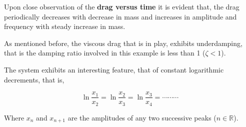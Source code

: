 {Upon close observation of the \textbf{drag versus time} it is evident that, the drag periodically decreases with decrease in mass and increases in amplitude and frequency with steady increase in mass.}

{As mentioned before, the viscous drag that is in play, exhibits underdamping, that is the damping ratio involved in this example is less than 1 ($\zeta < 1$).}

{The system exhibits an interesting feature, that of constant logarithmic decrements, that is,}
        
    $$\ln{\frac{x_1}{x_2}} = \ln{\frac{x_2}{x_3}} = \ln{\frac{x_3}{x_4}} = \cdots\cdots\cdots$$
        
{Where $x_n$ and $x_{n + 1}$ are the amplitudes of any two successive peaks ($n \in \mathbb{R}$).}
        


